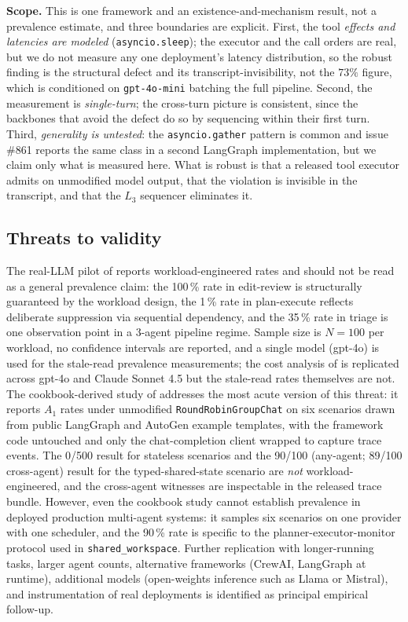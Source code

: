 \documentclass[journal,compsoc,10pt]{IEEEtran}
\theoremstyle{definition}
\theoremstyle{remark}
\begin{document}
\medskip
\noindent\textbf{Scope.} This is one framework and an existence-and-mechanism
result, not a prevalence estimate, and three boundaries are explicit. First,
the tool \emph{effects and latencies are modeled} (\texttt{asyncio.sleep}); the
executor and the call orders are real, but we do not measure any one
deployment's latency distribution, so the robust finding is the structural
defect and its transcript-invisibility, not the $73\%$ figure, which is
conditioned on \texttt{gpt-4o-mini} batching the full pipeline. Second, the
measurement is \emph{single-turn}; the cross-turn picture is consistent, since
the backbones that avoid the defect do so by sequencing within their first
turn. Third, \emph{generality is untested}: the \texttt{asyncio.gather} pattern
is common and issue \#861 reports the same class in a second LangGraph
implementation, but we claim only what is measured here. What is robust is that
a released tool executor admits  on unmodified model output, that
the violation is invisible in the transcript, and that the $L_3$ sequencer
eliminates it.

\subsection{Threats to validity}
\label{sec:threats}
The
real-LLM pilot of  reports
workload-engineered rates and should not be read as a general
prevalence claim: the 100\,\% rate in edit-review is structurally
guaranteed by the workload design, the 1\,\% rate in plan-execute
reflects deliberate suppression via sequential dependency, and the
35\,\% rate in triage is one observation point in a 3-agent
pipeline regime. Sample size is $N=100$ per workload, no confidence
intervals are reported, and a single model (gpt-4o) is used for
the stale-read prevalence measurements; the cost analysis of
 is replicated across gpt-4o and Claude
Sonnet 4.5 but the stale-read rates themselves are not.
The cookbook-derived study of  addresses
the most acute version of this threat: it reports $A_1$ rates
under unmodified \texttt{RoundRobinGroupChat} on six
scenarios drawn from public LangGraph and AutoGen example
templates, with the framework code untouched and only the
chat-completion client wrapped to capture trace events.
The 0/500 result for stateless scenarios and the
90/100 (any-agent; 89/100 cross-agent) result for the
typed-shared-state scenario are
\emph{not} workload-engineered, and the cross-agent witnesses
are inspectable in the released trace bundle. However, even
the cookbook study cannot establish prevalence in deployed
production multi-agent systems: it samples six scenarios on
one provider with one scheduler, and the 90\,\% rate is
specific to the planner-executor-monitor protocol used in
\texttt{shared\_workspace}.
Further replication with longer-running tasks, larger agent
counts, alternative frameworks (CrewAI, LangGraph at runtime),
additional models (open-weights inference such as Llama or
Mistral), and instrumentation of real deployments is identified
as principal empirical follow-up.
\end{document}
